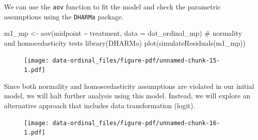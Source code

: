 \documentclass[
  letterpaper,
]{book}
\newenvironment{Shaded}{\begin{snugshade}}{\end{snugshade}}
\newcommand{\AttributeTok}[1]{\textcolor[rgb]{0.40,0.45,0.13}{#1}}
\newcommand{\CommentTok}[1]{\textcolor[rgb]{0.37,0.37,0.37}{#1}}
\newcommand{\DecValTok}[1]{\textcolor[rgb]{0.68,0.00,0.00}{#1}}
\newcommand{\FunctionTok}[1]{\textcolor[rgb]{0.28,0.35,0.67}{#1}}
\newcommand{\NormalTok}[1]{\textcolor[rgb]{0.00,0.23,0.31}{#1}}
\newcommand{\OtherTok}[1]{\textcolor[rgb]{0.00,0.23,0.31}{#1}}
\newcommand{\SpecialCharTok}[1]{\textcolor[rgb]{0.37,0.37,0.37}{#1}}
\begin{document}
We can use the \texttt{aov} function to fit the model and check the
parametric assumptions using the \texttt{DHARMa} package.

\begin{Shaded}
\begin{Highlighting}[]
\NormalTok{m1\_mp }\OtherTok{\textless{}{-}} \FunctionTok{aov}\NormalTok{(midpoint }\SpecialCharTok{\textasciitilde{}}\NormalTok{ treatment, }\AttributeTok{data =}\NormalTok{ dat\_ordinal\_mp)}
\CommentTok{\# normality and homocedasticity tests}
\FunctionTok{library}\NormalTok{(DHARMa)}
\FunctionTok{plot}\NormalTok{(}\FunctionTok{simulateResiduals}\NormalTok{(m1\_mp))}
\end{Highlighting}
\end{Shaded}

\begin{figure}[H]

{\centering \texttt{[image: data-ordinal\_files/figure-pdf/unnamed-chunk-15-1.pdf]}

}

\end{figure}

Since both normality and homoscedasticity assumptions are violated in
our initial model, we will halt further analysis using this model.
Instead, we will explore an alternative approach that includes data
transformation (logit).

\begin{Shaded}
\end{Shaded}

\begin{figure}[H]

{\centering \texttt{[image: data-ordinal\_files/figure-pdf/unnamed-chunk-16-1.pdf]}

}

\end{figure}
\end{document}

